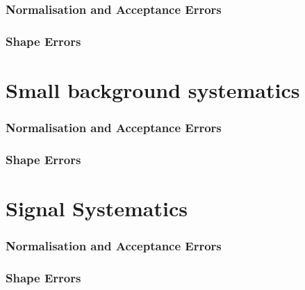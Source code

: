 \subsubsection{Normalisation and Acceptance Errors}

\subsubsection{Shape Errors}

\section{Small background systematics}


\subsubsection{Normalisation and Acceptance Errors}

\subsubsection{Shape Errors}

\section{Signal Systematics}


\subsubsection{Normalisation and Acceptance Errors}

\subsubsection{Shape Errors}




